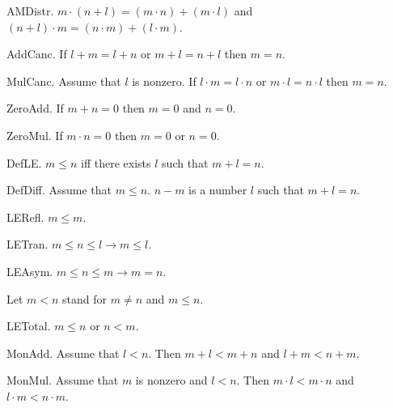 \begin{axiom} AMDistr.  
$m \cdot (n + l) = (m \cdot n) + (m \cdot l)$ and
$(n + l) \cdot m = (n \cdot m) + (l \cdot m)$.\end{axiom}

\begin{axiom} AddCanc.  
If $l + m = l + n$ or $m + l = n + l$ then $m = n$.\end{axiom}

\begin{axiom} MulCanc.
Assume that $l$ is nonzero. If 
$l \cdot m = l \cdot n$ or $m \cdot l = n \cdot l$ 
then $m = n$.\end{axiom}

\begin{axiom} ZeroAdd.
If $m + n = 0$ then $m = 0$ and $n = 0$.\end{axiom}

\begin{lemma} ZeroMul.
If $m \cdot n = 0$ then $m = 0$ or $n = 0$.
\end{lemma}

\begin{definition} DefLE.
$m \leq n$ iff there exists $l$ such that $m + l = n$.
\end{definition}

\begin{definition} DefDiff.  Assume that $m \leq n$.
$n - m$ is a number $l$ such that $m + l = n$.
\end{definition}

\begin{lemma} LERefl. $m \leq m$. \end{lemma}
\begin{lemma} LETran. $m \leq n \leq l  \rightarrow  m \leq l$.
\end{lemma}
\begin{lemma} LEAsym. $m \leq n \leq m  \rightarrow  m = n$. 
\end{lemma}

Let $m < n$ stand for $m \neq n$ and $m \leq n$.

\begin{axiom} LETotal. $m \leq n$ or $n < m$. \end{axiom}

\begin{lemma} MonAdd. Assume that $l < n$.
Then $m + l < m + n$ and $l + m < n + m$.
\end{lemma}

\begin{lemma} MonMul. Assume that $m$ is nonzero and $l < n$.
Then $m \cdot l < m \cdot n$ and $l \cdot m < n \cdot m$.
\end{lemma}

